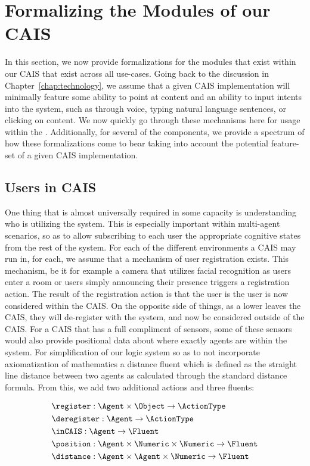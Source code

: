 \section{Formalizing the Modules of our CAIS}

In this section, we now provide formalizations for the modules that exist within our
CAIS that exist across all use-cases. Going back to the discussion in 
Chapter~\ref{chap:technology}, we assume that a given CAIS implementation will minimally
feature some ability to point at content and an ability to input intents into the system,
such as through voice, typing natural language sentences, or clicking on content. We now
quickly go through these mechanisms here for usage within the \CEC. Additionally, for
several of the components, we provide a spectrum of how these formalizations come to bear
taking into account the potential feature-set of a given CAIS implementation.

\subsection{Users in CAIS}

One thing that is almost universally required in some capacity is understanding who is
utilizing the system. This is especially important within multi-agent scenarios, so
as to allow subscribing to each user the appropriate cognitive states from the rest
of the system. For each of the different environments a CAIS may run in, for each,
we assume that a mechanism of user registration exists. This mechanism, be it for
example a camera that utilizes facial recognition as users enter a room or users
simply announcing their presence triggers a registration action. The result of the
registration action is that the user is the user is now considered within the CAIS.
On the opposite side of things, as a lower leaves the CAIS, they will de-register
with the system, and now be considered outside of the CAIS. For a CAIS that has a
full compliment of sensors, some of these sensors would also provide positional
data about where exactly agents are within the system. For simplification of our
logic system so as to not incorporate axiomatization of mathematics a distance
fluent which is defined as the straight line distance between two agents as calculated
through the standard distance formula. From this, we add two
additional actions and three fluents:

\begin{equation*}
\begin{aligned}
  & \register: \Agent \times \Object \rightarrow \ActionType \\
  & \deregister: \Agent \rightarrow \ActionType \\
  & \inCAIS: \Agent \rightarrow \Fluent \\
  & \position: \Agent \times \Numeric \times \Numeric \rightarrow \Fluent \\
  & \distance: \Agent \times \Agent \times \Numeric \rightarrow \Fluent \\
\end{aligned}
\end{equation*}

